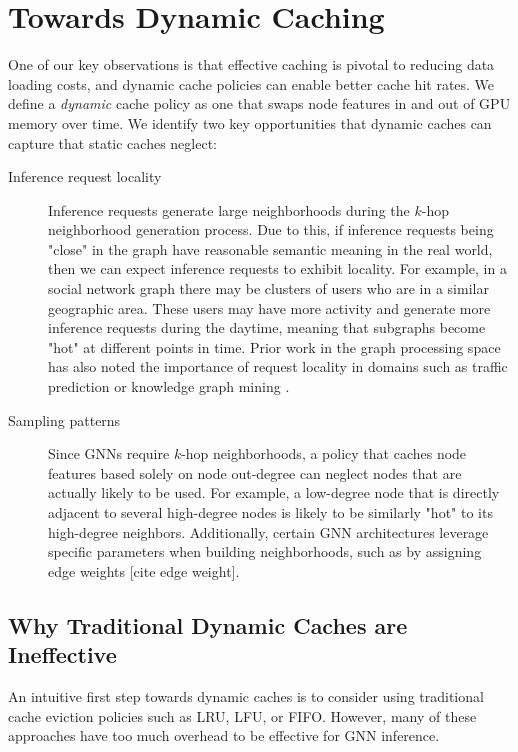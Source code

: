 \section{Towards Dynamic Caching} \label{Design: Towards Dynamic Caching}
One of our key observations is that effective caching is pivotal to reducing data loading costs, and dynamic cache policies can enable better cache hit rates.
We define a \textit{dynamic} cache policy as one that swaps node features in and out of GPU memory over time. We identify two key opportunities  that dynamic caches can capture that static caches neglect:
\begin{description}
    \item[Inference request locality] Inference requests generate large neighborhoods during the $k$-hop neighborhood generation process. Due to this, if inference requests being "close" in the graph have reasonable semantic meaning in the real world, then we can expect inference requests to exhibit locality. For example, in a social network graph there may be clusters of users who are in a similar geographic area. These users may have more activity and generate more inference requests during the daytime, meaning that subgraphs become "hot" at different points in time. Prior work in the graph processing space has also noted the importance of request locality in domains such as traffic prediction or knowledge graph mining \cite{QGraph_2018}.
    \item[Sampling patterns] Since GNNs require $k$-hop neighborhoods, a policy that caches node features based solely on node out-degree can neglect nodes that are actually likely to be used. For example, a low-degree node that is directly adjacent to several high-degree nodes is likely to be similarly "hot" to its high-degree neighbors. Additionally, certain GNN architectures leverage specific parameters when building neighborhoods, such as by assigning edge weights [cite edge weight].
\end{description}

\subsection{Why Traditional Dynamic Caches are Ineffective}
An intuitive first step towards dynamic caches is to consider using traditional cache eviction policies such as LRU, LFU, or FIFO. However, many of these approaches have too much overhead to be effective for GNN inference. 

